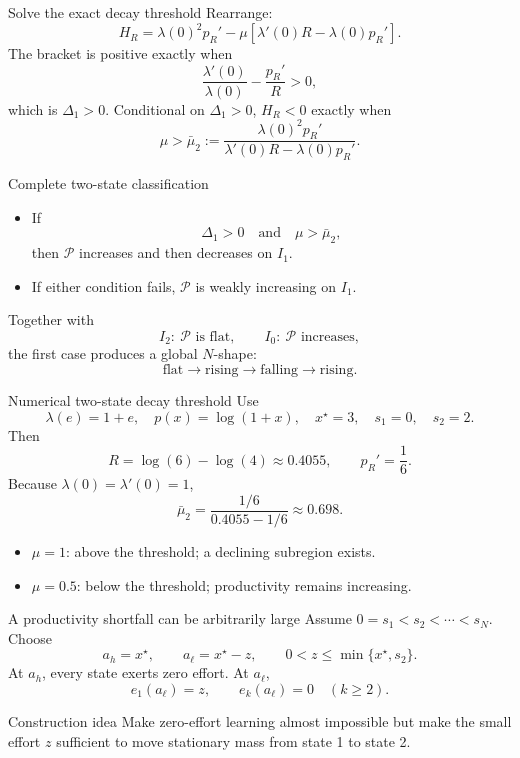 \documentclass[aspectratio=169,10pt]{beamer}
\newcommand{\calP}{\mathcal{P}}
\begin{document}
\begin{frame}{Solve the exact decay threshold}
Rearrange:
\[
H_R=
\lambda(0)^2p_R'
-\mu[
\lambda'(0)R-\lambda(0)p_R'].
\]
The bracket is positive exactly when
\[
\frac{\lambda'(0)}{\lambda(0)}
-
\frac{p_R'}{R}
>0,
\]
which is $\Delta_1>0$.
\vspace{2mm}
Conditional on $\Delta_1>0$, $H_R<0$ exactly when
\[
\boxed{
\mu>
\bar\mu_2:=
\frac{\lambda(0)^2p_R'}
{\lambda'(0)R-\lambda(0)p_R'}.}
\]
\end{frame}

\begin{frame}{Complete two-state classification}
\begin{itemize}
  \item If
  \[
  \Delta_1>0
  \quad\text{and}\quad
  \mu>\bar\mu_2,
  \]
  then $\calP$ increases and then decreases on $I_1$.
  \item If either condition fails, $\calP$ is weakly increasing on $I_1$.
\end{itemize}
\vspace{3mm}
Together with
\[
I_2:\ \calP\text{ is flat},
\qquad
I_0:\ \calP\text{ increases},
\]
the first case produces a global $N$-shape:
\[
\text{flat}\to\text{rising}\to\text{falling}\to\text{rising}.
\]
\end{frame}

\begin{frame}{Numerical two-state decay threshold}
Use
\[
\lambda(e)=1+e,\quad
p(x)=\log(1+x),\quad
x^\star=3,\quad
s_1=0,\quad
s_2=2.
\]
Then
\[
R=\log(6)-\log(4)\approx0.4055,
\qquad
p_R'=\frac16.
\]
Because $\lambda(0)=\lambda'(0)=1$,
\[
\bar\mu_2=
\frac{1/6}{0.4055-1/6}
\approx0.698.
\]
\begin{itemize}
  \item $\mu=1$: above the threshold; a declining subregion exists.
  \item $\mu=0.5$: below the threshold; productivity remains increasing.
\end{itemize}
\end{frame}

\begin{frame}{A productivity shortfall can be arbitrarily large}
Assume $0=s_1<s_2<\cdots<s_N$. Choose
\[
a_h=x^\star,
\qquad
a_\ell=x^\star-z,
\qquad
0<z\le\min\{x^\star,s_2\}.
\]
At $a_h$, every state exerts zero effort.
\vspace{2mm}
At $a_\ell$,
\[
e_1(a_\ell)=z,
\qquad
e_k(a_\ell)=0\quad(k\ge2).
\]
\begin{block}{Construction idea}
Make zero-effort learning almost impossible but make the small effort $z$ sufficient to move stationary mass from state 1 to state 2.
\end{block}
\end{frame}
\end{document}
